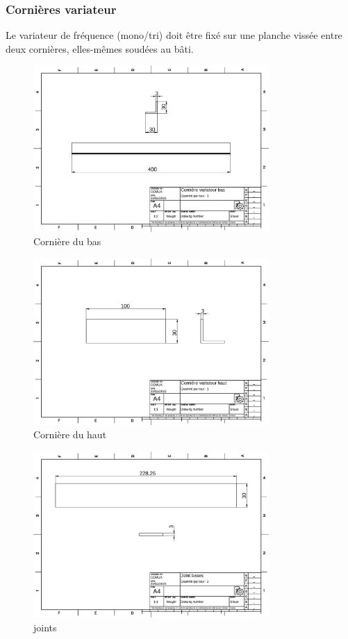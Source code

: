 \documentclass[a4paper]{article}
\begin{document}
\subsubsection{Cornières variateur}
Le variateur de fréquence (mono/tri) doit être fixé sur une planche vissée entre deux cornières, elles-mêmes soudées au bâti. 
\begin{figure}[H]
    \centering
    \includegraphics*[width=0.8\textwidth]{../plans/corniere-variateur-bas}
    \caption{Cornière du bas}
    \label{fig:corniere-variateur-bas}
\end{figure}
\begin{figure}[H]
    \centering
    \includegraphics*[width=0.8\textwidth]{../plans/corniere-variateur-haut}
    \caption{Cornière du haut}
    \label{fig:corniere-variateur-haut}
\end{figure}
\begin{figure}[H]
    \centering
    \includegraphics*[width=0.8\textwidth]{../plans/joint-base}
    \caption{joints}
    \label{fig:joints}
\end{figure}
\end{document}
